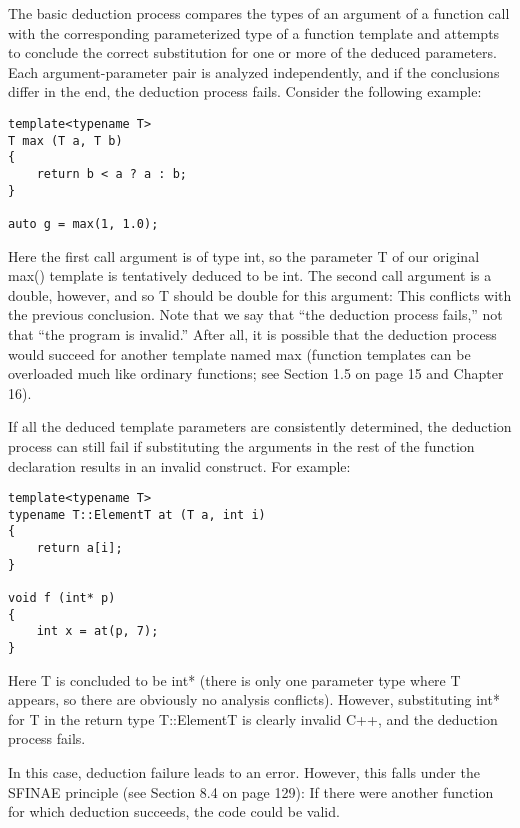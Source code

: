 The basic deduction process compares the types of an argument of a function call with the corresponding parameterized type of a function template and attempts to conclude the correct substitution  for one or more of the deduced parameters. Each argument-parameter pair is analyzed independently, and if the conclusions differ in the end, the deduction process fails. Consider the following  example:
 
\begin{lstlisting}[style=styleCXX]
template<typename T>
T max (T a, T b)
{
	return b < a ? a : b;
}

auto g = max(1, 1.0);
\end{lstlisting} 
 
Here the first call argument is of type int, so the parameter T of our original max() template is tentatively deduced to be int. The second call argument is a double, however, and so T should be double for this argument: This conflicts with the previous conclusion. Note that we say that “the  deduction process fails,” not that “the program is invalid.” After all, it is possible that the deduction  process would succeed for another template named max (function templates can be overloaded much  like ordinary functions; see Section 1.5 on page 15 and Chapter 16).
 
If all the deduced template parameters are consistently determined, the deduction process can still fail if substituting the arguments in the rest of the function declaration results in an invalid construct. For example:

\begin{lstlisting}[style=styleCXX]
template<typename T>
typename T::ElementT at (T a, int i)
{
	return a[i];
}

void f (int* p)
{
	int x = at(p, 7);
}
\end{lstlisting} 

Here T is concluded to be int* (there is only one parameter type where T appears, so there are obviously no analysis conflicts). However, substituting int* for T in the return type T::ElementT is clearly invalid C++, and the deduction process fails.

\begin{tcolorbox}[colback=webgreen!5!white,colframe=webgreen!75!black]
\hspace*{0.75cm}In this case, deduction failure leads to an error. However, this falls under the SFINAE principle (see Section 8.4 on page 129): If there were another function for which deduction succeeds, the code could be valid.
\end{tcolorbox}

